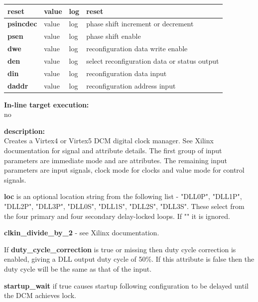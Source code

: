 \begin{tabular}{| l | l | l | l |}
            {\bf reset}                   & value     & log   & reset \\ \hline
            {\bf psincdec}                & value     & log   & phase shift increment or decrement\\ \hline
            {\bf psen}                    & value     & log   & phase shift enable\\ \hline
            {\bf dwe}                     & value     & log   & reconfiguration data write enable\\ \hline
            {\bf den}                     & value     & log   & select reconfiguration data or status output\\ \hline
            {\bf din}                     & value     & log   & reconfiguration data input \\
            {\bf daddr}                   & value     & log   & reconfiguration address input \\ \hline
            \end{tabular}

            {\bf In-line target execution:} \\
            no

            {\bf description:} \\
            Creates a Virtex4 or Virtex5 DCM digital clock manager. See Xilinx
            documentation for signal and attribute details. The first group of input
            parameters are immediate mode and are attributes. The remaining input
            parameters are input signals, clock mode for clocks and value mode for
            control signals.


                {\bf loc} is an optional location string from the
                following list - "DLL0P", "DLL1P", "DLL2P", "DLL3P", "DLL0S", "DLL1S",
                "DLL2S", "DLL3S". These select from the four primary and four secondary
                delay-locked loops. If "" it is ignored.

                {\bf clkin\_divide\_by\_2} - see Xilinx documentation.

                If {\bf duty\_cycle\_correction} is true or missing then duty cycle
                correction is enabled, giving a DLL output duty cycle of 50\%. If
                this attribute is false then the duty cycle will be the same as that
                of the input.

                {\bf startup\_wait} if true causes startup following configuration to
                be delayed until the DCM achieves lock.

